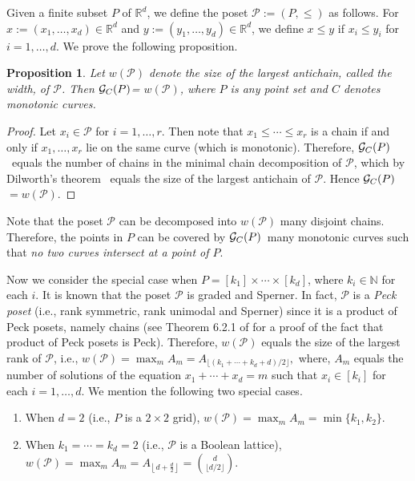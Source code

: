 \documentclass[
final
]{dmtcs-episciences}
\numberwithin{equation}{subsection}
\newtheorem{prop}[defn]{Proposition}%
\newcommand{\ga}{${\cal G}_C(P)$}
\begin{document}
\medskip

Given a finite subset $P$ of $\mathbb{R}^d$, we define the poset $\mathcal{P} := (P,\leq)$ as follows. For $x:=(x_1,\ldots , x_d)\in\mathbb{R}^d$ and $y:=(y_1,\ldots ,y_d)\in\mathbb{R}^d$, we define $x\leq y$ if $x_i\leq y_i$ for  $i=1,\ldots ,d$. We prove the following proposition.
\begin{prop}
	Let $w(\mathcal{P})$ denote the size of the largest antichain, called the width, of $\mathcal{P}$. Then \ga = $w(\mathcal{P})$, where $P$ is any point set and $C$ denotes monotonic curves.
\end{prop}
\begin{proof}
	Let $x_i\in\mathcal{P}$ for $i=1,\ldots,r$. Then note that $x_1\leq\cdots \leq x_r$ is a chain if and only if $x_1,\ldots ,x_r$ lie on the same curve (which is monotonic). Therefore, \ga~equals the number of chains in the minimal chain decomposition of $\mathcal{P}$, which by Dilworth's theorem~\cite{dilworth} equals the size of the largest antichain of $\mathcal{P}$. Hence \ga$=w(\mathcal{P})$.
\end{proof}

Note that the poset $\mathcal{P}$ can be decomposed into $w(\mathcal{P})$ many disjoint chains. Therefore, the points in $P$ can be covered by \ga~many monotonic curves such that  \textit{no two curves intersect at a point of $P$}.

\medskip

Now we consider the special case when $P=[k_1] \times \cdots \times [k_d]$, where $k_i \in \mathbb{N}$ for each $i$. It is known that the poset $\mathcal{P}$ is graded and Sperner. In fact, $\mathcal{P}$ is a {\it Peck poset} (i.e., rank symmetric, rank unimodal and Sperner) since it is a product of Peck posets, namely chains (see Theorem 6.2.1 of \cite{engel} for a proof of the fact that product of Peck posets is Peck). Therefore, $w(\mathcal{P})$ equals the size of the largest rank of $\mathcal{P}$, i.e., 
$w(\mathcal{P})=\max_m A_m = A_{\lfloor (k_1+\cdots +k_d+d)/2\rfloor},$
where, $A_m$ equals the number of solutions of the equation $x_1+\cdots +x_d=m$ such that $x_i\in[k_i]$ for each $i=1,\ldots, d$. We mention the following two special cases.
\begin{enumerate}
	
	\item[(i)] When $d=2$ (i.e., $P$ is a $2\times 2$ grid), $w(\mathcal{P})=\max_m A_m = \min\{k_1,k_2\}$.
	
	\item[(ii)] When $k_1= \cdots= k_d = 2$ (i.e., $\mathcal{P}$ is a Boolean lattice), $w(\mathcal{P})=\max_m A_m = A_{\left\lfloor d + \frac{d}{2}\right\rfloor}=\binom{d}{\lfloor d/2\rfloor}$.		
\end{enumerate}
\end{document}
